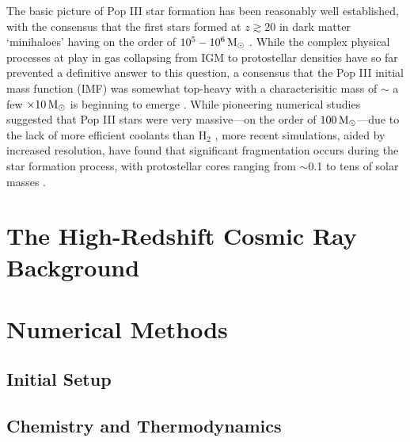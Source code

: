 \documentclass[useAMS,usenatbib]{mn2e}
\newcommand{\msun}{\,{\rm M}_{\odot}}
\newcommand{\htwo}{\mathrm{H}_2}
\begin{document}
The basic picture of Pop III star formation has been reasonably well established, with the consensus that the first stars formed at $z\gtrsim20$ in dark matter `minihaloes' having on the order of $10^5 - 10^6\msun$ \citep{CouchmanRees1986, HaimanThoulLoeb1996, Tegmarketal1997}. While the complex physical processes at play in gas collapsing from IGM to protostellar densities have so far prevented a definitive answer to this question, a consensus that the Pop III initial mass function (IMF) was somewhat top-heavy with a characterisitic mass of $\sim$ a few $\times 10\msun$ is beginning to emerge \citep{Bromm2013}.  While pioneering numerical studies suggested that Pop III stars were very massive---on the order of $100\msun$---due to the lack of more efficient coolants than $\htwo$ \citep[e.g.,][]{BrommCoppiLarson1999, BrommCoppiLarson2002, AbelBryanNorman2002, Yoshidaetal2003, BrommLarson2004, Yoshidaetal2006, O'SheaNorman2007}, more recent simulations, aided by increased resolution, have found that significant fragmentation occurs during the star formation process, with protostellar cores ranging from $\sim$0.1 to tens of solar masses \citep{StacyGreifBromm2010, Clarketal2011a, Clarketal2011b, Greifetal2011, Greifetal2012, StacyBromm2013, Hiranoetal2014}.


\section{The High-Redshift Cosmic Ray Background}
\label{crb}

\section{Numerical Methods}
\label{methods}

\subsection{Initial Setup}
\label{setup}



\subsection{Chemistry and Thermodynamics}
\label{chemistry}
\end{document}
